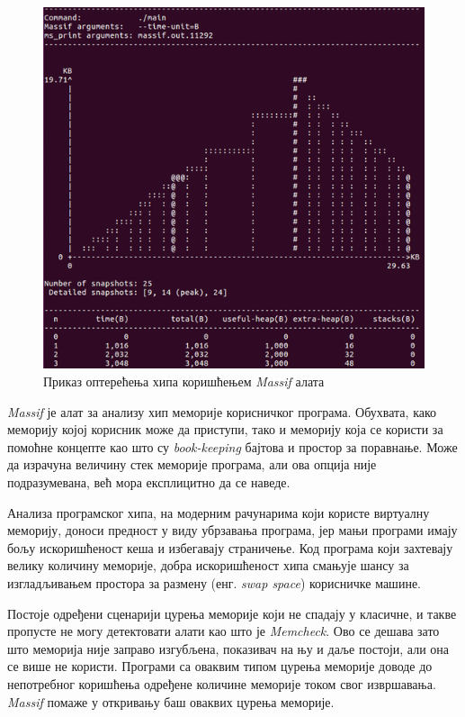 \documentclass[12pt,oneside]{memoir}
\begin{document}
\begin{figure}[h!]
\begin{center}
\includegraphics[scale=0.75]{slika19.png}
\end{center}
\caption{Приказ оптерећења хипа коришћењем \textit{Massif} алата}
\label{fig:massif}
\end{figure}

\indent \textit{Massif} је алат за анализу хип меморије корисничког програма. Обухвата, како меморију којој корисник може да приступи, тако и меморију која се користи за помоћне концепте као што су \textit{book-keeping} бајтова и простор за поравнање. Може да израчуна величину стек меморије програма, али ова опција није подразумевана, већ мора експлицитно да се наведе.

\indent Анализа програмског хипа, на модерним рачунарима који користе виртуалну меморију, доноси предност у виду убрзавања програма, јер мањи програми имају бољу искоришћеност кеша и избегавају страничење. Код програма који захтевају велику количину меморије, добра искоришћеност хипа смањује шансу за изгладљивањем простора за размену (енг. \textit{swap space}) корисничке машине.

\indent Постоје одређени сценарији цурења меморије који не спадају у класичне, и такве пропусте не могу детектовати алати као што је \textit{Memcheck}. Ово се дешава зато што меморија није заправо изгубљена, показивач на њу и даље постоји, али она се више не користи. Програми са оваквим типом цурења меморије доводе до непотребног коришћења одређене количине меморије током свог извршавања. \textit{Massif} помаже у откривању баш оваквих цурења меморије.
\end{document}
